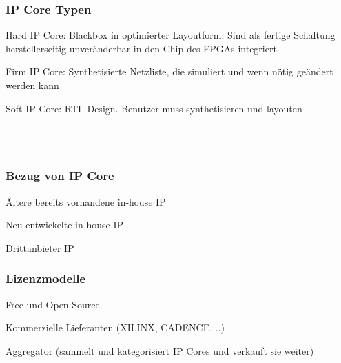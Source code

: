 \begin{multicols}{2}
    \subsubsection{IP Core Typen}
    \begin{compactitem}
        \item Hard IP Core: Blackbox in optimierter Layoutform. Sind als fertige Schaltung herstellerseitig unveränderbar in den Chip des FPGAs integriert
        \item Firm IP Core: Synthetisierte Netzliste, die simuliert und wenn nötig geändert werden kann 
        \item Soft IP Core: RTL Design. Benutzer muss synthetisieren und layouten 
    \end{compactitem}
    \ \\ \ \\
\end{multicols}
\begin{minipage}{0.40\textwidth}
    \subsubsection{Bezug von IP Core}
    \begin{compactitem}
        \item Ältere bereits vorhandene in-house IP
        \item Neu entwickelte in-house IP
        \item Drittanbieter IP
    \end{compactitem}
\end{minipage}
\hfill
\begin{minipage}{0.55\textwidth}
    \subsubsection{Lizenzmodelle}
    \begin{compactitem}
        \item Free und Open Source
        \item Kommerzielle Lieferanten (XILINX, CADENCE, ..)
        \item Aggregator (sammelt und kategorisiert IP Cores und verkauft sie weiter)
    \end{compactitem}
\end{minipage}
